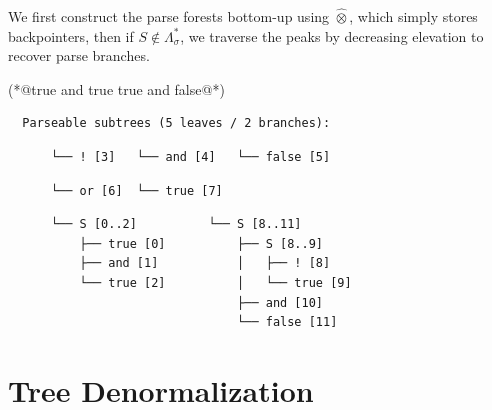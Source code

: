 \documentclass[sigplan,nonacm]{acmart}\settopmatter{printfolios=false,printccs=false,printacmref=false}
\begin{document}
\noindent We first construct the parse forests bottom-up using $\hat{\otimes}$, which simply stores backpointers, then if $S \notin \Lambda^*_\sigma$, we traverse the peaks by decreasing elevation to recover parse branches.

\begin{tidyinput}
(*@true and true  true and false\caret{ }@*)
\end{tidyinput}

\begin{verbatim}
  Parseable subtrees (5 leaves / 2 branches):
\end{verbatim}
\vspace{5pt}
\noindent\hspace{0.97cm}\hspace{1.69cm}\hspace{2cm}\vspace{-8pt}
\begin{verbatim}
      └── ! [3]   └── and [4]   └── false [5]
\end{verbatim}
\vspace{5pt}
\noindent\hspace{0.97cm}\hspace{1.69cm}\vspace{-8pt}
\begin{verbatim}
      └── or [6]  └── true [7]
\end{verbatim}
\vspace{5pt}
\hspace{0.97cm}\hspace{3.38cm}\vspace{-8pt}
\begin{verbatim}
      └── S [0..2]          └── S [8..11]
          ├── true [0]          ├── S [8..9]
          ├── and [1]           │   ├── ! [8]
          └── true [2]          │   └── true [9]
                                ├── and [10]
                                └── false [11]
\end{verbatim}

\pagebreak
\section{Tree Denormalization}

\end{document}
